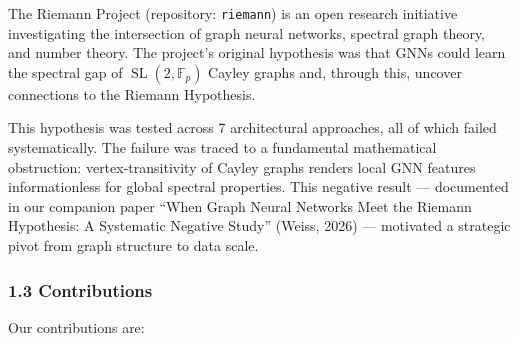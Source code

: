 \documentclass[
]{article}
\begin{document}
The Riemann Project (repository: \texttt{riemann}) is an open research
initiative investigating the intersection of graph neural networks,
spectral graph theory, and number theory. The project's original
hypothesis was that GNNs could learn the spectral gap of
\(\operatorname{SL}(2,\mathbb{F}_p)\) Cayley graphs and, through this,
uncover connections to the Riemann Hypothesis.

This hypothesis was tested across 7 architectural approaches, all of
which failed systematically. The failure was traced to a fundamental
mathematical obstruction: vertex-transitivity of Cayley graphs renders
local GNN features informationless for global spectral properties. This
negative result --- documented in our companion paper ``When Graph
Neural Networks Meet the Riemann Hypothesis: A Systematic Negative
Study'' (Weiss, 2026) --- motivated a strategic pivot from graph
structure to data scale.

\hypertarget{contributions}{%
\subsubsection{1.3 Contributions}\label{contributions}}

Our contributions are:
\end{document}

